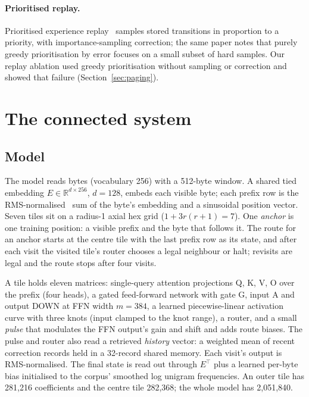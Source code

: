 \documentclass[10pt]{article}
\begin{document}
\paragraph{Prioritised replay.}
Prioritised experience replay~\citep{schaul2016per} samples stored transitions in proportion to a
priority, with importance-sampling correction; the same paper notes that purely greedy
prioritisation by error focuses on a small subset of hard samples. Our replay ablation used greedy
prioritisation without sampling or correction and showed that failure (Section~\ref{sec:paging}).

\section{The connected system}
\label{sec:system}

\subsection{Model}
\label{sec:model}

The model reads bytes (vocabulary 256) with a 512-byte window. A shared tied embedding
$E\in\mathbb{R}^{d\times 256}$, $d=128$, embeds each visible byte; each prefix row is the
RMS-normalised~\citep{zhang2019rmsnorm} sum of the byte's embedding and a sinusoidal position
vector. Seven tiles sit on a radius-1 axial hex grid ($1+3r(r+1)=7$). One \emph{anchor} is one
training position: a visible prefix and the byte that follows it. The route for an anchor starts at
the centre tile with the last prefix row as its state, and after each visit the visited tile's router
chooses a legal neighbour or halt; revisits are legal and the route stops after four visits.

A tile holds eleven matrices: single-query attention projections Q, K, V, O over the prefix
(four heads), a gated feed-forward network with gate G, input A and output DOWN at FFN width
$m=384$, a learned piecewise-linear activation curve with three knots (input clamped to the knot
range), a router, and a small \emph{pulse} that modulates the FFN output's gain and shift and adds
route biases. The pulse and router also read a retrieved \emph{history} vector: a weighted mean of
recent correction records held in a 32-record shared memory. Each visit's output is RMS-normalised.
The final state is read out through $E^\top$ plus a learned per-byte bias initialised to the
corpus' smoothed log unigram frequencies. An outer tile has 281,216 coefficients and the centre tile
282,368; the whole model has 2,051,840.
\end{document}
